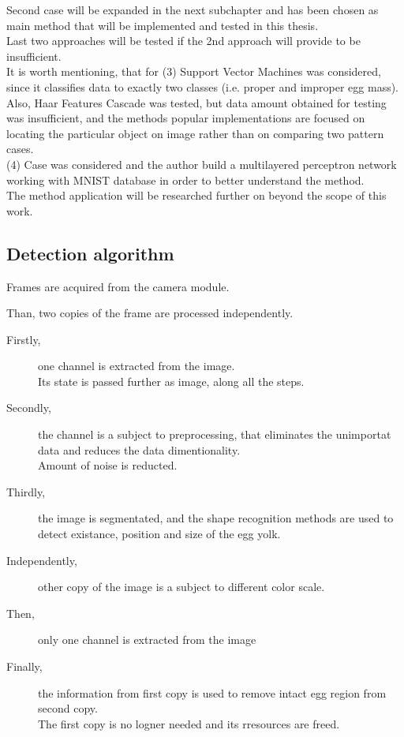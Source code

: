 \documentclass[12pt,twoside,a4paper]{article}
\begin{document}
Second case will be expanded in the next subchapter and has been chosen as main method that will be implemented and tested in this thesis.\\

Last two approaches will be tested if the 2nd approach will provide to be insufficient.\\
It is worth mentioning, that for (3) Support Vector Machines was considered, since it classifies data to exactly two classes (i.e. proper and improper egg mass).\\

Also, Haar Features Cascade was tested, but data amount obtained for testing was insufficient, and the methods popular implementations are focused on locating the particular object on image rather than on comparing two pattern cases.\\

(4) Case was considered and the author build a multilayered perceptron network working with MNIST database in order to better understand the method.\\
The method application will be researched further on beyond the scope of this work.



\subsection{Detection algorithm}

Frames are acquired from the camera module.

Than, two copies of the frame are processed independently.

\begin{description}
  \item[Firstly,]one channel is extracted from the image.\\
  Its state is passed further as image, along all the steps.
  \item[Secondly,]the channel is a subject to preprocessing, that eliminates the unimportat data and reduces the data dimentionality.\\ 
  Amount of noise is reducted.
  \item[Thirdly,]the image is segmentated, and the shape recognition methods are used to detect existance, position and size of the egg yolk.
  \item[Independently,]other copy of the image is a subject to different color scale.
  \item[Then,]only one channel is extracted from the image
  \item[Finally,]the information from first copy is used to remove intact egg region from second copy.\\The first copy is no logner needed and its rresources are freed.
\end{description}
\end{document}
